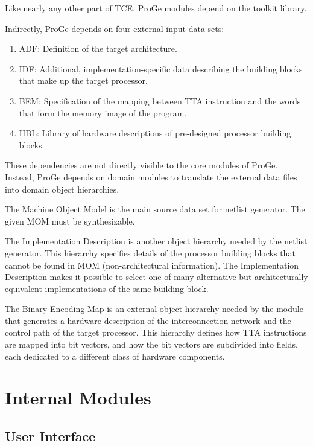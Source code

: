 \documentclass[a4paper,twoside]{tce}
\begin{document}
Like nearly any other part of TCE, ProGe modules depend on the toolkit
library.
%

Indirectly, ProGe depends on four external input data sets:
\begin{enumerate}
\item%
  ADF: Definition of the target architecture.
\item%
  IDF: Additional, implementation-specific data describing the building
  blocks that make up the target processor.
\item%
  BEM: Specification of the mapping between TTA instruction and the words
  that form the memory image of the program.
\item%
  HBL: Library of hardware descriptions of pre-designed processor building
  blocks.
\end{enumerate}

These dependencies are not directly visible to the core modules of
ProGe. Instead, ProGe depends on domain modules to translate the external
data files into domain object hierarchies.

The Machine Object Model is the main source data set for netlist
generator. The given MOM must be synthesizable.

The Implementation Description is another object hierarchy needed by the
netlist generator. This hierarchy specifies details of the processor
building blocks that cannot be found in MOM (non-architectural
information). The Implementation Description makes it possible to select one
of many alternative but architecturally equivalent implementations of the
same building block.

The Binary Encoding Map is an external object hierarchy needed by the module
that generates a hardware description of the interconnection network and the
control path of the target processor. This hierarchy defines how TTA
instructions are mapped into bit vectors, and how the bit vectors are
subdivided into fields, each dedicated to a different class of hardware
components.


\chapter{Internal Modules}
\label{ch:internal-modules}

\section{User Interface}
\end{document}
